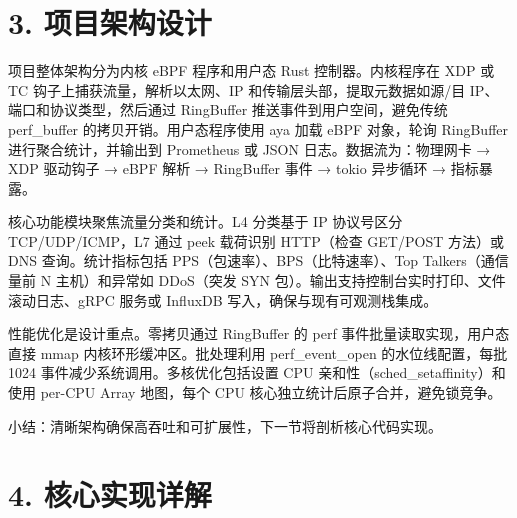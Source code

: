 \chapter{3. 项目架构设计}
项目整体架构分为内核 eBPF 程序和用户态 Rust 控制器。内核程序在 XDP 或 TC 钩子上捕获流量，解析以太网、IP 和传输层头部，提取元数据如源/目 IP、端口和协议类型，然后通过 RingBuffer 推送事件到用户空间，避免传统 perf\_{}buffer 的拷贝开销。用户态程序使用 aya 加载 eBPF 对象，轮询 RingBuffer 进行聚合统计，并输出到 Prometheus 或 JSON 日志。数据流为：物理网卡 → XDP 驱动钩子 → eBPF 解析 → RingBuffer 事件 → tokio 异步循环 → 指标暴露。\par
核心功能模块聚焦流量分类和统计。L4 分类基于 IP 协议号区分 TCP/UDP/ICMP，L7 通过 peek 载荷识别 HTTP（检查 GET/POST 方法）或 DNS 查询。统计指标包括 PPS（包速率）、BPS（比特速率）、Top Talkers（通信量前 N 主机）和异常如 DDoS（突发 SYN 包）。输出支持控制台实时打印、文件滚动日志、gRPC 服务或 InfluxDB 写入，确保与现有可观测栈集成。\par
性能优化是设计重点。零拷贝通过 RingBuffer 的 perf 事件批量读取实现，用户态直接 mmap 内核环形缓冲区。批处理利用 perf\_{}event\_{}open 的水位线配置，每批 1024 事件减少系统调用。多核优化包括设置 CPU 亲和性（sched\_{}setaffinity）和使用 per-CPU Array 地图，每个 CPU 核心独立统计后原子合并，避免锁竞争。\par
小结：清晰架构确保高吞吐和可扩展性，下一节将剖析核心代码实现。\par
\chapter{4. 核心实现详解}
